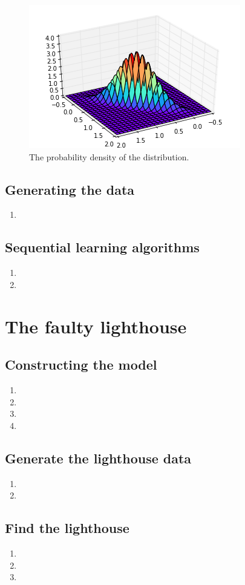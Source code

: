 \documentclass[a4paper,10pt]{article}
\numberwithin{equation}{section} %
\numberwithin{figure}{section} %
\numberwithin{table}{section} %
\theoremstyle{mytheor}
\begin{document}
\begin{enumerate}
		\begin{figure}[h!]
   			\centering
   			\includegraphics{probdens.png}\vspace{-0.2cm}
   			\caption{\vspace{-0.2cm} The probability density of the distribution.}
  		\end{figure}
\end{enumerate}
\subsection{Generating the data}
\begin{enumerate}
	\item
\end{enumerate}
\subsection{Sequential learning algorithms}
\begin{enumerate}
	\item
	\item
\end{enumerate}

\section{The faulty lighthouse}
\subsection{Constructing the model}
\begin{enumerate}
	\item 
	\item 
	\item
	\item
\end{enumerate}
\subsection{Generate the lighthouse data}
\begin{enumerate}
	\item
	\item 
\end{enumerate}
\subsection{Find the lighthouse}
\begin{enumerate}
	\item
	\item 
	\item 
\end{enumerate}
\end{document}
